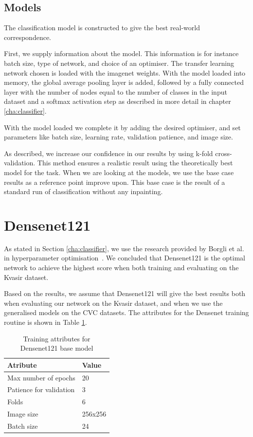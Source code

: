 \subsection{Models}
The classification model is constructed to give the best real-world correspondence.

First, we supply information about the model. This information is for instance batch size, type of network, and choice of an optimiser. 
The transfer learning network chosen is loaded with the imagenet weights. With the model loaded into memory, the global average pooling layer is added, followed by a fully connected layer with the number of nodes equal to the number of classes in the input dataset and a softmax activation step as described in more detail in chapter \ref{cha:classifier}. 

With the model loaded we complete it by adding the desired optimiser, and set parameters like batch size, learning rate, validation patience, and image size.

As described, we increase our confidence in our results by using k-fold cross-validation. This method ensures a realistic result using the theoretically best model for the task. 
When we are looking at the models, we use the base case results as a reference point improve upon. This base case is the result of a standard run of classification without any inpainting.


\FloatBarrier
\section{Densenet121}

As stated in Section \ref{cha:classifier}, we use the research provided by Borgli et al. in hyperparameter optimisation~\cite{runeMedico2018}. We concluded that Densenet121 is the optimal network to achieve the highest score when both training and evaluating on the Kvasir dataset. 

Based on the results, we assume that Densenet121 will give the best results both when evaluating our network on the Kvasir dataset, and when we use the generalised models on the CVC datasets. The attributes for the Densenet training routine is shown in Table \ref{tab:TrainingAttrDN121}.



\begin{table}[h]
\begin{center}
\begin{tabular}{ll}
\toprule
Atribute                & Value   \\
\midrule
Max number of epochs    & 20      \\
Patience for validation & 3       \\
Folds                   & 6       \\
Image size              & 256x256 \\
Batch size              & 24      \\   
\bottomrule
\end{tabular}
\end{center}
\caption{Training attributes for Densenet121 base model }
\label{tab:TrainingAttrDN121}
\end{table}

